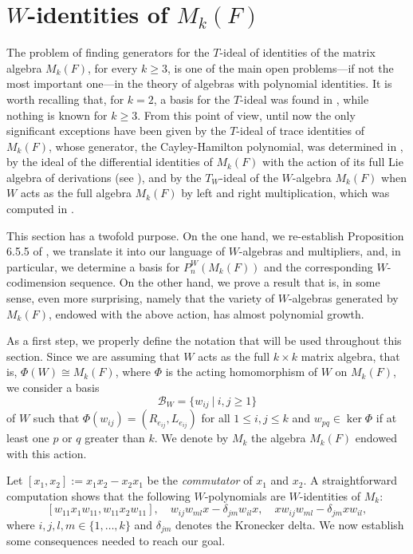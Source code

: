 \documentclass[reqno]{amsart}
\theoremstyle{definition}
\numberwithin{equation}{section}
\numberwithin{theorem}{section}
\begin{document}
\section{$W$-identities of $M_k(F)$}

The problem of finding generators for the \( T \)-ideal of identities of the matrix algebra \( M_k(F) \), for every \( k \geq 3 \), is one of the main open problems—if not the most important one—in the theory of algebras with polynomial identities. It is worth recalling that, for \( k = 2 \), a basis for the \( T \)-ideal was found in \cite{Drensky1981, Koshlukov2001, Razmyslov1973}, while nothing is known for \( k \geq 3 \). From this point of view, until now the only significant exceptions have been given by the \( T \)-ideal of trace identities of \( M_k(F) \), whose generator, the Cayley-Hamilton polynomial, was determined in \cite{Procesi1976, Razmyslov1974}, by the ideal of the differential identities of $M_k(F)$ with the action of its full Lie algebra of derivations (see \cite{BroxRizzo2024}),
and by the $T_W$-ideal of the $W$-algebra $M_k(F)$ when \( W \) acts as the full algebra \( M_k(F) \) by left and right multiplication, which was computed in \cite[Proposition 6.5.5]{BeidarMartindaleMikhalevm1996}.

This section has a twofold purpose. On the one hand, we re-establish Proposition 6.5.5 of \cite{BeidarMartindaleMikhalevm1996}, we translate it into our language of $W$-algebras and multipliers, and, in particular, we determine a basis for $P_n^W(M_k(F))$ and the corresponding $W$-codimension sequence. On the other hand, we prove a result that is, in some sense, even more surprising, namely that the variety of \( W \)-algebras generated by \( M_k(F) \), endowed with the above action, has almost polynomial growth.

As a first step, we properly define the notation that will be used throughout this section. Since we are assuming that $W$ acts as the full $k\times k$ matrix algebra, that is, $\Phi(W)\cong M_k(F)$, where $\Phi$ is the acting homomorphism of $W$ on $M_k(F)$, we consider a basis
$$
\mathcal B_W =\{w_{ij} \ | \ i,j\geq 1\}
$$
of $W$ such that $\Phi(w_{ij}) = (R_{e_{ij}}, L_{e_{ij}})$ for all $1\leq i,j\leq k$ and $w_{pq}\in \ker\Phi$ if at least one $p$ or $q$ greater than $k$. We denote by $M_k$ the algebra $M_k(F)$ endowed with this action.

    Let $[x_1,x_2]:=x_1x_2-x_2x_1$ be the {\em commutator} of $x_1$ and $x_2$.   A straightforward computation shows that the following $W$-polynomials are $W$-identities of $M_k$: 
\begin{equation}\label{preconseguenze}
    [w_{11}x_1w_{11},w_{11}x_2w_{11}], \quad w_{ij}w_{ml}x-\delta_{jm}w_{il}x, \quad xw_{ij}w_{ml}-\delta_{jm}xw_{il},
\end{equation}
    where $i,j,l,m\in \{1,\ldots, k\}$ and $\delta_{jm}$ denotes the Kronecker delta. We now establish some consequences needed to reach our goal. 
\end{document}
